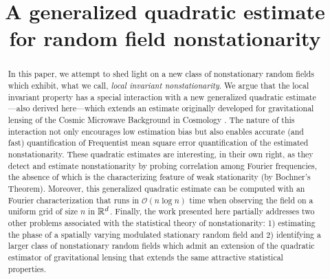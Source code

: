 \documentclass[10pt,noinfoline]{imsart}
\begin{document}
\begin{frontmatter}

\title{A generalized quadratic estimate for random field nonstationarity
}


\begin{abstract}
In this paper, we attempt to shed light on a new class of nonstationary random fields which exhibit, what we call, {\em local invariant nonstationarity}. We argue that the local invariant property has a special interaction with a new  generalized quadratic estimate---also derived here---which extends an estimate originally developed for gravitational lensing of the Cosmic Microwave Background in Cosmology \cite{hu2001mapping, hu2002mass}. The nature of this interaction not only encourages low estimation bias but also enables accurate (and fast) quantification of Frequentist mean square error quantification of the estimated nonstationarity. These quadratic estimates are interesting, in their own right, as they detect and estimate nonstationarity by probing correlation among Fourier frequencies, the absence of which is the characterizing feature of weak stationarity (by Bochner's Theorem). Moreover, this generalized quadratic estimate can be computed with an Fourier characterization that runs in $\mathcal O(n\log n)$ time when observing the field on a uniform grid of size $n$ in $\Bbb R^d $. Finally, the work presented here partially addresses two other problems associated with the statistical theory of nonstationarity: 1) estimating the phase of a spatially varying modulated stationary random field and 2) identifying a larger class of nonstationary random fields which admit an extension of the quadratic estimator of gravitational lensing that extends the same attractive statistical properties.
\end{abstract}
\end{frontmatter}
\end{document}
